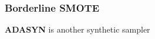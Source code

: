 \begin{comment}
	\begin{figure}[H]
	\label{fig:tube}
	\centering
	\texttt{[image: tube.jpg]}
	\caption{Conservation in thin long tube (3D), with variables varying only in one dimension (from C.P. Fall, 2005)}
	\end{figure}
\end{comment}


\subsubsection{Borderline SMOTE}




\textbf{ADASYN} is another synthetic sampler 










\begin{comment}
\NoCaptionOfAlgo
\begin{algorithm}[H]
\SetAlgoLined
\DontPrintSemicolon
\SetKwComment{Comment}{$\triangleright$\ }{}
\SetAlCapSkip{1em}
\SetAlCapNameFnt{\normalfont\normalsize}
\caption{Timestep $\textcolor{darkgray}{t \to t + \delta t}$}

Select a random sample of the minority class\;

\For{c in \texttt{cells}}{
    $
    \textcolor{darkgray}{r_c} :=
    \begin{cases*}
        \color{teal}{r_S} &\text{if c is sensitive} \\
        \color{purple}{r_R} &\text{if c is resistent}\\
    \end{cases*}$\;
    Total propensity $\textcolor{darkgray}{p := (r_c + d_T) \delta t}$\;
    \uIf{$\textcolor{Purple}{u < p}$}{ \tcp{cell active}
        \uIf{$\textcolor{Purple}{u < \frac{r_c \delta t}{p}}$}{
            \texttt{AttemptProliferation}\;
        }
        \Else{
            \texttt{Death}\;
        }
    } 
    \Else{  \tcp{cell inactive}
        \texttt{continue}\;
    }
}
\end{algorithm}
\end{comment}
